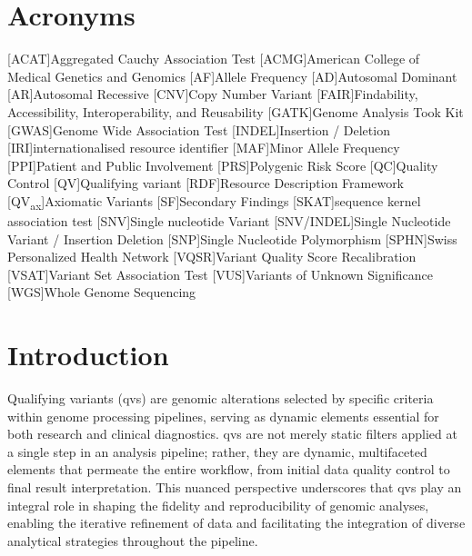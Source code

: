 \section*{Acronyms}
\renewenvironment{description} %
{\list{}{\labelwidth0pt\itemindent-\leftmargin
    \parsep-1em\itemsep0pt\let\makelabel\descriptionlabel}}
               {\endlist}
\begin{acronym} 
 [ACAT]{Aggregated Cauchy Association Test }
 [ACMG]{American College of Medical Genetics and Genomics}
 [AF]{Allele Frequency}
 [AD]{Autosomal Dominant}
 [AR]{Autosomal Recessive}
  [CNV]{Copy Number Variant}
 [FAIR]{Findability, Accessibility, Interoperability, and Reusability}
 [GATK]{Genome Analysis Took Kit}
 [GWAS]{Genome Wide Association Test}
 [INDEL]{Insertion / Deletion}
 [IRI]{internationalised resource identifier}
 [MAF]{Minor Allele Frequency}
 [PPI]{Patient and Public Involvement}
 [PRS]{Polygenic Risk Score} 
 [QC]{Quality Control}
 [QV]{Qualifying variant}
 [RDF]{Resource Description Framework}
 [QV\textsubscript{ax}]{Axiomatic Variants}
 [SF]{Secondary Findings}
 [SKAT]{sequence kernel association test} 
 [SNV]{Single nucleotide Variant}
  [SNV/INDEL]{Single Nucleotide Variant / Insertion Deletion}
 [SNP]{Single Nucleotide Polymorphism}
 [SPHN]{Swiss Personalized Health Network}
 [VQSR]{Variant Quality Score Recalibration}
 [VSAT]{Variant Set Association Test}
 [VUS]{Variants of Unknown Significance}
 [WGS]{Whole Genome Sequencing}
\end{acronym}

\clearpage

\section{Introduction}
\label{sec:intro}

Qualifying variants (\ac{qv}s) are genomic alterations selected by specific criteria within genome processing pipelines, serving as dynamic elements essential for both research and clinical diagnostics. 
\ac{qv}s are not merely static filters applied at a single step in an analysis pipeline; rather, they are dynamic, multifaceted elements that permeate the entire workflow, from initial data quality control to final result interpretation. This nuanced perspective underscores that \ac{qv}s play an integral role in shaping the fidelity and reproducibility of genomic analyses, enabling the iterative refinement of data and facilitating the integration of diverse analytical strategies throughout the pipeline.

